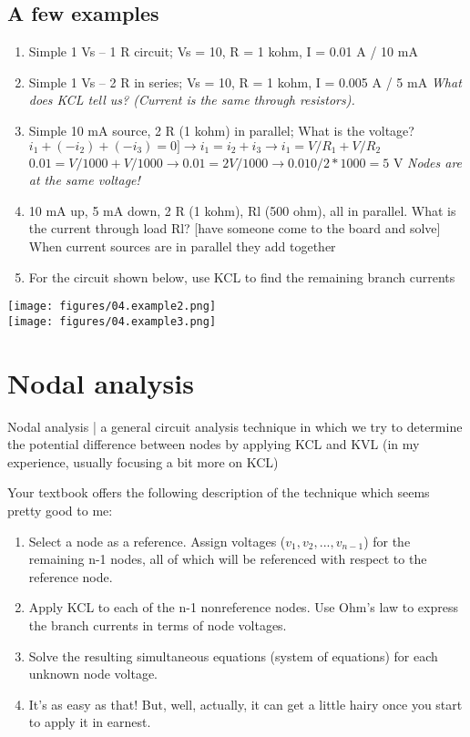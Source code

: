 \documentclass[11pt]{book}
\begin{document}
\subsection{A few examples}
\begin{enumerate}
	\item Simple 1 Vs – 1 R circuit; Vs = 10, R = 1 kohm, I = 0.01 A / 10 mA
	\item Simple 1 Vs – 2 R in series; Vs = 10, R = 1 kohm, I = 0.005 A / 5 mA
	\subitem \textit{What does KCL tell us? (Current is the same through  resistors). }
	\item Simple 10 mA source, 2 R (1 kohm) in parallel; What is the voltage?
	\subitem $i_1 + (-i_2) + (-i_3) = 0 ] \rightarrow i_1 = i_2 + i_3 \rightarrow i_1 = V/R_1 + V/R_2$ 
	\subitem $0.01 = V/1000 + V/1000 \rightarrow 0.01 = 2V/1000 \rightarrow 0.010/2*1000 = 5$ V
	\subitem \textit{Nodes are at the same voltage!}
	\item 10 mA up, 5 mA down, 2 R (1 kohm), Rl (500 ohm), all in parallel. What is the current through load Rl? [have someone come to the board and solve]
	\subitem When current sources are in parallel they add together 
	\item For the circuit shown below, use KCL to find the remaining branch currents
\end{enumerate}

\begin{center}
	\texttt{[image: figures/04.example2.png]}
\\
\texttt{[image: figures/04.example3.png]}

\end{center}


\newpage
\section{Nodal analysis}
Nodal analysis | a general circuit analysis technique in which we try to determine the potential difference between nodes by applying KCL and KVL (in my experience, usually focusing a bit more on KCL)

Your textbook offers the following description of the technique which seems pretty good to me:
\begin{enumerate}
	\item Select a node as a reference. Assign voltages ($v_1, v_2, ..., v_{n-1}$) for the remaining n-1 nodes, all of which will be referenced with respect to the reference node.
	\item Apply KCL to each of the n-1 nonreference nodes. Use Ohm’s law to express the branch currents in terms of node voltages.
	\item Solve the resulting simultaneous equations (system of equations) for each unknown node voltage.
	\item It's as easy as that! But, well, actually, it can get a little hairy once you start to apply it in earnest.
\end{enumerate}
\end{document}
